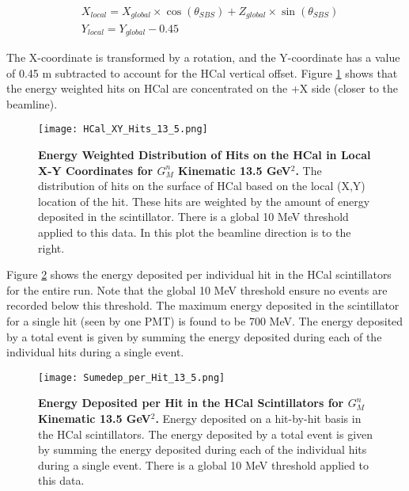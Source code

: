 \documentclass[10pt]{article}
\begin{document}
	\begin{align}
		&X_{local} = X_{global}\times\cos\left(\theta_{SBS}\right) + Z_{global}\times\sin\left(\theta_{SBS}\right) \\
		&Y_{local} = Y_{global} - 0.45
	\end{align}
	
	\noindent The X-coordinate is transformed by a rotation, and the Y-coordinate has a value of 0.45 m subtracted to account for the HCal vertical offset. Figure \ref{fig:xy_hits} shows that the energy weighted hits on HCal are concentrated on the +X side (closer to the beamline). \\
	
	\begin{figure}[!ht]
	\begin{center}
	\texttt{[image: HCal\_XY\_Hits\_13\_5.png]}
	\end{center}
	\caption{
	{\bf{Energy Weighted Distribution of Hits on the HCal in Local X-Y Coordinates for $G_M^n$ Kinematic 13.5 GeV$^2$.}} The distribution of hits on the surface of HCal based on the local (X,Y) location of the hit. These hits are weighted by the amount of energy deposited in the scintillator. There is a global 10 MeV threshold applied to this data. In this plot the beamline direction is to the right.}
	\label{fig:xy_hits}
	\end{figure}	
	
	Figure \ref{fig:sumedep} shows the energy deposited per individual hit in the HCal scintillators for the entire run. Note that the global 10 MeV threshold ensure no events are recorded below this threshold. The maximum energy deposited in the scintillator for a single hit (seen by one PMT) is found to be 700 MeV. The energy deposited by a total event is given by summing the energy deposited during each of the individual hits during a single event.\\
	
	\begin{figure}[!ht]
	\begin{center}
	\texttt{[image: Sumedep\_per\_Hit\_13\_5.png]}
	\end{center}
	\caption{
	{\bf{Energy Deposited per Hit in the HCal Scintillators for $G_M^n$ Kinematic 13.5 GeV$^2$.}} Energy deposited on a hit-by-hit basis in the HCal scintillators. The energy deposited by a total event is given by summing the energy deposited during each of the individual hits during a single event. There is a global 10 MeV threshold applied to this data.}
	\label{fig:sumedep}
	\end{figure}	
	
\end{document}
